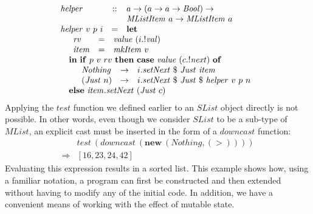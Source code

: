 \documentclass[authoryear,preprint]{sigplanconf}
\begin{document}
\begin{displaymath}
\begin{array}{lcl}
\mathit{helper} & :: &  a \to (a \to a \to \mathit{Bool}) \to \\
& & \mathit{MListItem}~a \to \mathit{MListItem}~a \\
\mathit{helper}~v~p~i & = & \mathbf{let} \\
\multicolumn{3}{l}{\quad \begin{array}{lcl}
    \mathit{rv} & = & \mathit{value}~(i.!\mathit{val}) \\
    \mathit{item} & = & \mathit{mkItem}~v
    \end{array}}\\
\multicolumn{3}{l}{\quad \mathbf{in}~\mathbf{if}~p~v~rv~\mathbf{then}~\mathbf{case}~\mathit{value}~(c.!\mathit{next})~\mathbf{of}} \\
\multicolumn{3}{l}{\quad \quad \begin{array}{lcl}
    \mathit{Nothing} & \to & i.\mathit{setNext}~\$~\mathit{Just}~\mathit{item} \\
    (\mathit{Just}~n) & \to & i.\mathit{setNext}~\$~\mathit{Just}~\$~\mathit{helper}~v~p~n 
    \end{array}} \\
\multicolumn{3}{l}{\quad \mathbf{else}~\mathit{item}.\mathit{setNext}~(\mathit{Just}~c)}
\end{array}
\end{displaymath}
Applying the $\mathit{test}$ function we defined earlier to an $\mathit{SList}$ object directly is not possible. In other words, even though we consider $\mathit{SList}$ to be a sub-type of $\mathit{MList}$, an explicit cast must be inserted in the form of a $\mathit{downcast}$ function:
\begin{displaymath}
\begin{array}{cl}
& \mathit{test}~(\mathit{downcast}~(\mathbf{new}~(\mathit{Nothing},(>)))) \\
\Rightarrow & [16,23,24,42]
\end{array}
\end{displaymath}   
Evaluating this expression results in a sorted list. This example shows how, using a familiar notation, a program can first be constructed and then extended without having to modify any of the initial code. In addition, we have a convenient means of working with the effect of mutable state.
\end{document}

